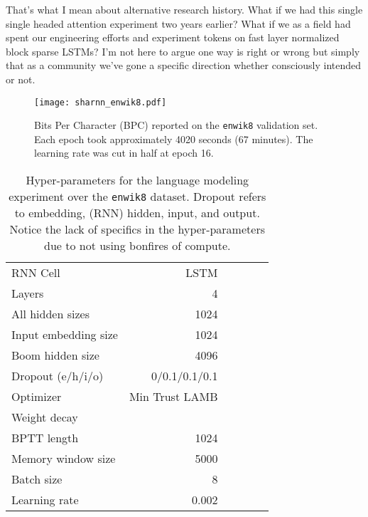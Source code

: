 \documentclass{article}
\newcommand{\enwik}{\texttt{enwik8}\xspace}
\begin{document}
That's what I mean about alternative research history.
What if we had this single single headed attention experiment two years earlier?
What if we as a field had spent our engineering efforts and experiment tokens on fast layer normalized block sparse LSTMs?
I'm not here to argue one way is right or wrong but simply that as a community we've gone a specific direction whether consciously intended or not.











\begin{figure}[t]
 \centering 
 \texttt{[image: sharnn\_enwik8.pdf]}
\caption{Bits Per Character (BPC) reported on the \enwik validation set. Each epoch took approximately 4020 seconds (67 minutes). The learning rate was cut in half at epoch 16.}
\label{fig:bpcsharnn}
\end{figure}

\begin{table}
\renewcommand{\arraystretch}{1.1}
\begin{center}
 \begin{tabular}{@{} lrrrrr @{}} 
 \toprule[1.5pt]
\midrule
 RNN Cell & \small{LSTM} \\ Layers & 4 \\
 All hidden sizes & 1024 \\
 Input embedding size & 1024 \\
 Boom hidden size & 4096 \\
 Dropout (e/h/i/o) & 0/0.1/0.1/0.1 \\
\midrule
 Optimizer & Min Trust LAMB \\
 Weight decay &  \\
 BPTT length & 1024 \\
 Memory window size & 5000 \\
 Batch size & 8 \\
 Learning rate & 0.002 \\
 \midrule
\bottomrule[1.5pt]
\end{tabular}
\caption{
Hyper-parameters for the language modeling experiment over the \enwik dataset.
Dropout refers to embedding, (RNN) hidden, input, and output.
Notice the lack of specifics in the hyper-parameters due to not using bonfires of compute.
\label{table:fullhypers}}
\end{center}
\end{table}
\end{document}
